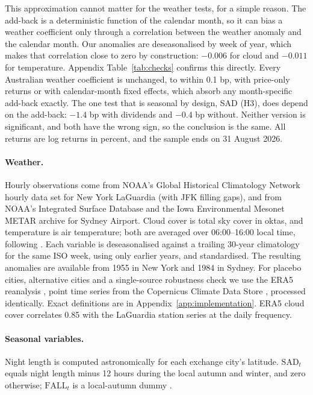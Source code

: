 \documentclass[11pt]{article}
\begin{document}
This approximation cannot matter for the weather tests, for a simple reason. The add-back is a
deterministic function of the calendar month, so it can bias a weather coefficient only through
a correlation between the weather anomaly and the calendar month. Our anomalies are deseasonalised
by week of year, which makes that correlation close to zero by construction: $-0.006$ for cloud and
$-0.011$ for temperature. Appendix Table~\ref{tab:checks} confirms this directly. Every Australian
weather coefficient is unchanged, to within 0.1 bp, with price-only returns or with calendar-month
fixed effects, which absorb any month-specific add-back exactly. The one test that is seasonal by
design, SAD (H3), does depend on the add-back: $-1.4$ bp with dividends and $-0.4$ bp without.
Neither version is significant, and both have the wrong sign, so the conclusion is the same. All
returns are log returns in percent, and the sample ends on 31 August 2026.

\paragraph{Weather.} Hourly observations come from NOAA's Global Historical Climatology Network
hourly data set \citep{ghcnh} for New York LaGuardia (with JFK filling gaps), and from NOAA's
Integrated Surface Database \citep{smith2011} and the Iowa Environmental Mesonet METAR archive
\citep{iem} for Sydney Airport. Cloud cover is total
sky cover in oktas, and temperature is air temperature; both are averaged over 06:00--16:00 local
time, following \citet{hirshleifer2003}. Each variable is deseasonalised against a trailing
30-year climatology for the same ISO week, using only earlier years, and standardised. The
resulting anomalies are available from 1955 in New York and 1984 in Sydney. For placebo cities,
alternative cities and a single-source robustness check we use the ERA5 reanalysis
\citep{hersbach2020}, point time series from the Copernicus Climate Data Store
\citep{c3s_timeseries}, processed identically. Exact definitions are in
Appendix~\ref{app:implementation}. ERA5 cloud cover
correlates 0.85 with the LaGuardia station series at the daily frequency.

\paragraph{Seasonal variables.} Night length is computed astronomically for each exchange city's
latitude. $\mathrm{SAD}_t$ equals night length minus 12 hours during the local autumn and winter,
and zero otherwise; $\mathrm{FALL}_t$ is a local-autumn dummy \citep{kamstra2003}.
\end{document}
